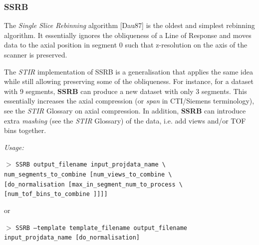 \documentclass{article}
\newcommand{\cmdline}[1]{\par \noindent $>$ \texttt{#1}\par}
\begin{document}
\subsubsection{
SSRB}
\label{sec:SSRB}
The \textit{Single Slice Rebinning} algorithm [Dau87] is the oldest 
and simplest rebinning algorithm. It essentially ignores the 
obliqueness of a Line of Response and moves data to the axial 
position in segment 0 such that z-resolution on the axis of the 
scanner is preserved.


The \textit{STIR} implementation of SSRB is a generalisation that applies 
the same idea while still allowing preserving some of the obliqueness. 
For instance, for a dataset with 9 segments, \textbf{SSRB} can produce 
a new dataset with only 3 segments. This essentially increases 
the axial compression (or \textit{span} in CTI/Siemens terminology), see the 
\textit{STIR} Glossary on axial compression. In addition, \textbf{SSRB} can 
introduce extra \textit{mashing} (see the \textit{STIR} Glossary) of the data, 
i.e. add views and/or TOF bins together.


\textit{Usage:}

\cmdline{SSRB output\_filename input\_projdata\_name {\textbackslash} \\
num\_segments\_to\_combine [num\_views\_to\_combine {\textbackslash}\\
{[}do\_normalisation [max\_in\_segment\_num\_to\_process {\textbackslash}\\
{[}num\_tof\_bins\_to\_combine ]]]]}
or
\cmdline{SSRB --template template\_filename output\_filename input\_projdata\_name [do\_normalisation]}
\end{document}
